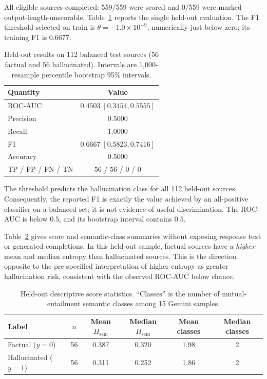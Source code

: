 \documentclass[11pt,a4paper]{article}
\newcommand{\Hsem}{H_{\mathrm{sem}}}
\begin{document}
All eligible sources completed: 559/559 were scored and 0/559 were marked output-length-unscorable.  Table~\ref{tab:metrics} reports the single held-out evaluation.  The F1 threshold selected on train is $\theta=-1.0\times10^{-9}$, numerically just below zero; its training F1 is $0.6677$.

\begin{table}[h]
\centering
\caption{Held-out results on 112 balanced test sources (56 factual and 56 hallucinated).  Intervals are 1,000-resample percentile bootstrap 95\% intervals.}
\label{tab:metrics}
\small
\begin{tabular}{@{}lc@{}}
\toprule
Quantity & Value \\
\midrule
ROC-AUC & $0.4503\;[0.3454,0.5555]$ \\
Precision & $0.5000$ \\
Recall & $1.0000$ \\
F1 & $0.6667\;[0.5823,0.7416]$ \\
Accuracy & $0.5000$ \\
TP / FP / FN / TN & $56$ / $56$ / $0$ / $0$ \\
\bottomrule
\end{tabular}
\end{table}

The threshold predicts the hallucination class for all 112 held-out sources.  Consequently, the reported F1 is exactly the value achieved by an all-positive classifier on a balanced set; it is not evidence of useful discrimination.  The ROC-AUC is below $0.5$, and its bootstrap interval contains $0.5$.

Table~\ref{tab:distribution} gives score and semantic-class summaries without exposing response text or generated completions.  In this held-out sample, factual sources have a \emph{higher} mean and median entropy than hallucinated sources.  This is the direction opposite to the pre-specified interpretation of higher entropy as greater hallucination risk, consistent with the observed ROC-AUC below chance.

\begin{table}[h]
\centering
\caption{Held-out descriptive score statistics.  ``Classes'' is the number of mutual-entailment semantic classes among 15 Gemini samples.}
\label{tab:distribution}
\small
\begin{tabular}{@{}lccccc@{}}
\toprule
Label & $n$ & Mean $\Hsem$ & Median $\Hsem$ & Mean classes & Median classes \\
\midrule
Factual ($y=0$) & 56 & 0.387 & 0.320 & 1.98 & 2 \\
Hallucinated ($y=1$) & 56 & 0.311 & 0.252 & 1.86 & 2 \\
\bottomrule
\end{tabular}
\end{table}
\end{document}
